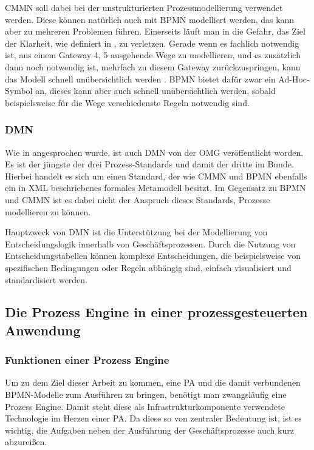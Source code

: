 \ac{CMMN} soll dabei bei der unstrukturierten Prozessmodellierung verwendet werden. Diese können natürlich auch mit \ac{BPMN} modelliert werden, das kann aber zu mehreren Problemen führen. Einerseits läuft man in die Gefahr, das Ziel der Klarheit, wie definiert in , zu verletzen. Gerade wenn es fachlich notwendig ist, aus einem Gateway 4, 5 ausgehende Wege zu modellieren, und es zusätzlich dann noch notwendig ist, mehrfach zu diesem Gateway zurückzuspringen, kann das Modell schnell unübersichtlich werden \citep[vgl.][S. 9]{freund_praxishandbuch_2017}. \ac{BPMN} bietet dafür zwar ein Ad-Hoc-Symbol an, dieses kann aber auch schnell unübersichtlich werden, sobald beispielsweise für die Wege verschiedenste Regeln notwendig sind. 

\subsubsection{\acl{DMN}}

Wie in  angesprochen wurde, ist auch \acl{DMN} von der \ac{OMG} veröffentlicht worden. Es ist der jüngste der drei Prozess-Standards und damit der dritte im Bunde. Hierbei handelt es sich um einen Standard, der wie \ac{CMMN} und \ac{BPMN} ebenfalls ein in XML beschriebenes formales Metamodell besitzt. Im Gegensatz zu \ac{BPMN} und \ac{CMMN} ist es dabei nicht der Anspruch dieses Standards, Prozesse modellieren zu können. \citep[vgl.][S. 10f]{freund_praxishandbuch_2017} 

Hauptzweck von \ac{DMN} ist die Unterstützung bei der Modellierung von Entscheidungslogik innerhalb von Geschäftsprozessen. Durch die Nutzung von Entscheidungstabellen können komplexe Entscheidungen, die beispielsweise von spezifischen Bedingungen oder Regeln abhängig sind, einfach visualisiert und standardisiert werden. \citep[vgl.][]{object_management_group_dmn_2025}

\clearpage
\subsection{Die Prozess Engine in einer prozessgesteuerten Anwendung}
\subsubsection{Funktionen einer Prozess Engine}
Um zu dem Ziel dieser Arbeit zu kommen, eine \acl{PA} und die damit verbundenen \ac{BPMN}-Modelle zum Ausführen zu bringen, benötigt man zwangsläufig eine Prozess Engine. Damit steht diese als Infrastrukturkomponente verwendete Technologie im Herzen einer \acl{PA}. Da diese so von zentraler Bedeutung ist, ist es wichtig, die Aufgaben neben der Ausführung der Geschäftsprozesse auch kurz abzureißen. \citep[vgl.][]{stiehl_prozessgesteuerte_2024}

